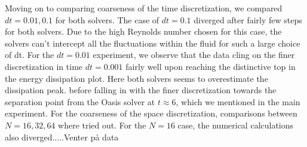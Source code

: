 \documentclass[a4paper,norsk]{article}
\begin{document}
Moving on to comparing coarseness of the time discretization, we compared $dt = 0.01, 0.1$ for both solvers. The case of
$dt = 0.1$ diverged after fairly few steps for both solvers. Due to the high Reynolds number chosen for this case, the solvers can't intercept all the fluctuations within the fluid for such a large choice of dt. For the $dt = 0.01$ experiment, we observe that the data cling on the finer discretization in time $dt = 0.001$ fairly well upon reaching the distinctive top in the energy dissipation plot. Here both solvers seems to overestimate the dissipation peak. before falling in with the finer discretization towards the separation point from the Oasis solver at $t \approx 6$, which we mentioned in the main experiment. 
\newpage
For the coarseness of the space discretization, comparisons between $N = 16, 32, 64$ where tried out. For the $N = 16$ case, the numerical calculations also diverged.....Venter på data
\end{document}
